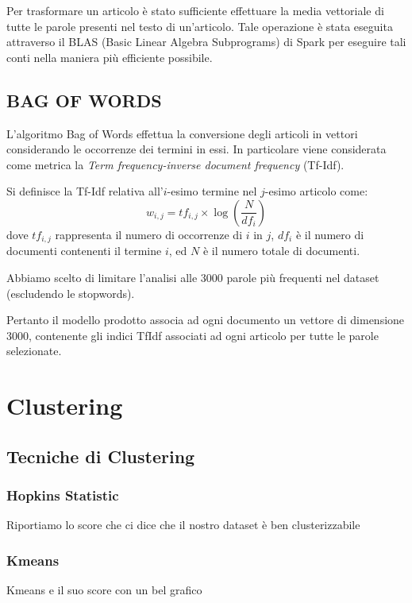 \documentclass[
	12pt, %
	a4paper, %
	oneside, %
	headinclude,footinclude, %
	BCOR5mm, %
]{scrartcl}
\begin{document}
        Per trasformare un articolo è stato sufficiente effettuare la media vettoriale di tutte le parole presenti
        nel testo di un'articolo. Tale operazione è stata eseguita attraverso il BLAS (Basic Linear Algebra Subprograms)
        di Spark per eseguire tali conti nella maniera più efficiente possibile.


	\subsection{BAG OF WORDS}

	L'algoritmo Bag of Words\cite{bagofwords} effettua la conversione degli articoli in vettori considerando le occorrenze dei termini in essi.
	In particolare viene considerata come metrica la \textit{Term frequency-inverse document frequency} (Tf-Idf).
	
	Si definisce la Tf-Idf relativa all'$i$-esimo termine nel $j$-esimo articolo come:
	$$
	w_{i,j}=tf_{i,j}\times\log(\frac{N}{df_{i}})
	$$
	dove $tf_{i,j}$ rappresenta il numero di occorrenze di $i$ in $j$, $df_{i}$ \`{e} il numero di documenti contenenti il termine $i$, ed $N$ \`{e} il numero totale di documenti.
	
	Abbiamo scelto di limitare l'analisi alle 3000 parole pi\`{u} frequenti nel dataset (escludendo le stopwords).
	
	Pertanto il modello prodotto associa ad ogni documento un vettore di dimensione 3000, contenente gli indici TfIdf associati ad ogni articolo per tutte le parole selezionate.
	


\section{Clustering}

	\subsection{Tecniche di Clustering}

		\subsubsection{Hopkins Statistic}
			Riportiamo lo score che ci dice che il nostro dataset è ben clusterizzabile

		\subsubsection{Kmeans}
			Kmeans e il suo score con un bel grafico
\end{document}

